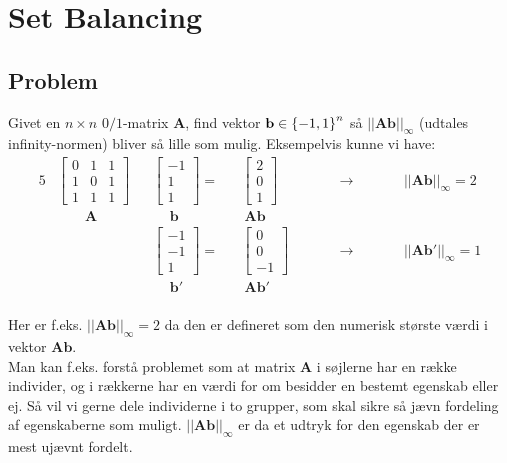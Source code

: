 \section{Set Balancing}
\subsection{Problem}

Givet en $n \times n$ $0/1$-matrix $\mathbf A$, find vektor $\mathbf b \in \left\{ -1, 1 \right\}^n$ så $||\mathbf{Ab}||_\infty$ (udtales infinity-normen) bliver så lille som mulig. Eksempelvis kunne vi have:
\begin{alignat*}{5}
  &\begin{bmatrix}
  0 & 1 & 1\\
  1 & 0 & 1\\
  1 & 1 & 1
  \end{bmatrix}
  &&\begin{bmatrix}
  -1\\
  1\\
  1
  \end{bmatrix}
  =
  &&\begin{bmatrix}
  2\\
  0\\
  1
  \end{bmatrix}
  \quad\quad &&\rightarrow \quad\quad
  &&||\mathbf{Ab}||_\infty = 2\\
  &\quad\quad \mathbf A
  &&\quad \ \mathbf b
  && \ \mathbf{Ab}\\
  &
  &&\begin{bmatrix}
  -1\\
  -1\\
  1
  \end{bmatrix}
  =
  &&\begin{bmatrix}
  0\\
  0\\
  -1
  \end{bmatrix}
  \quad\quad &&\rightarrow \quad\quad
  &&||\mathbf{Ab'}||_\infty = 1\\
  &
  &&\quad \ \mathbf b'
  && \ \mathbf{Ab'}\\
\end{alignat*}

Her er f.eks. $||\mathbf{Ab}||_\infty = 2$ da den er defineret som den numerisk største værdi i vektor $\mathbf{Ab}$.\\

Man kan f.eks. forstå problemet som at matrix $\mathbf A$ i søjlerne har en række individer, og i rækkerne har en værdi for om besidder en bestemt egenskab eller ej. Så vil vi gerne dele individerne i to grupper, som skal sikre så jævn fordeling af egenskaberne som muligt. $||\mathbf{Ab}||_\infty$ er da et udtryk for den egenskab der er mest ujævnt fordelt.







